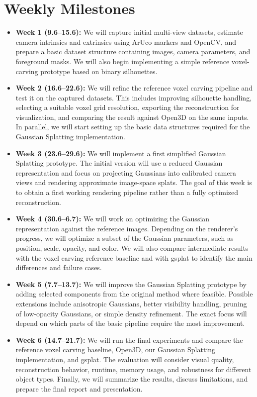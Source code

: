 \section{Weekly Milestones}
\begin{itemize}
\setlength{\itemsep}{0.5em}

\item \textbf{Week 1 (9.6--15.6):} We will capture initial multi-view datasets, estimate camera intrinsics and extrinsics using ArUco markers and OpenCV, and prepare a basic dataset structure containing images, camera parameters, and foreground masks. We will also begin implementing a simple reference voxel-carving prototype based on binary silhouettes.

\item \textbf{Week 2 (16.6--22.6):} We will refine the reference voxel carving pipeline and test it on the captured datasets. This includes improving silhouette handling, selecting a suitable voxel grid resolution, exporting the reconstruction for visualization, and comparing the result against Open3D on the same inputs. In parallel, we will start setting up the basic data structures required for the Gaussian Splatting implementation.

\item \textbf{Week 3 (23.6--29.6):} We will implement a first simplified Gaussian Splatting prototype. The initial version will use a reduced Gaussian representation and focus on projecting Gaussians into calibrated camera views and rendering approximate image-space splats. The goal of this week is to obtain a first working rendering pipeline rather than a fully optimized reconstruction.

\item \textbf{Week 4 (30.6--6.7):} We will work on optimizing the Gaussian representation against the reference images. Depending on the renderer's progress, we will optimize a subset of the Gaussian parameters, such as position, scale, opacity, and color. We will also compare intermediate results with the voxel carving reference baseline and with gsplat to identify the main differences and failure cases.

\item \textbf{Week 5 (7.7--13.7):} We will improve the Gaussian Splatting prototype by adding selected components from the original method where feasible. Possible extensions include anisotropic Gaussians, better visibility handling, pruning of low-opacity Gaussians, or simple density refinement. The exact focus will depend on which parts of the basic pipeline require the most improvement.

\item \textbf{Week 6 (14.7--21.7):} We will run the final experiments and compare the reference voxel carving baseline, Open3D, our Gaussian Splatting implementation, and gsplat. The evaluation will consider visual quality, reconstruction behavior, runtime, memory usage, and robustness for different object types. Finally, we will summarize the results, discuss limitations, and prepare the final report and presentation.

\end{itemize}
